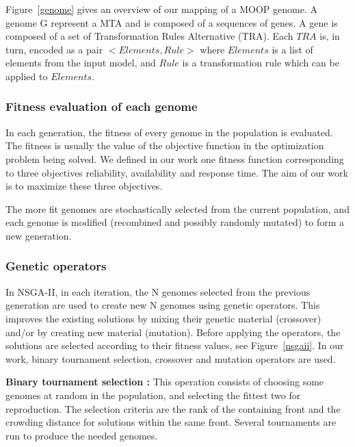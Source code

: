 \documentclass[conference]{IEEEtran}
\begin{document}
Figure~\ref{genome} gives an overview of our mapping of a MOOP genome. A genome G represent a MTA and is composed of a sequences of genes. A gene is composed of a set of Transformation Rules Alternative (TRA). Each $TRA$ is, in turn, encoded as a pair $<Elements,Rule>$ where $Elements$ is a list of elements from the input model, and $Rule$ is a transformation rule which can be applied to $Elements$.


\subsubsection{\textbf{Fitness evaluation of each genome}}
In each generation, the fitness of every genome in the population is evaluated. The fitness is usually the value of the objective function in the optimization problem being solved. We defined in our work one fitness function corresponding to three objectives reliability, availability and response time.
The aim of our work is to maximize these three objectives. 

The more fit genomes are stochastically selected from the current population, and each genome is modified (recombined and possibly randomly mutated) to form a new generation.

\subsubsection{\textbf{Genetic operators}}
In NSGA-II, in each iteration, the N genomes selected from the previous generation are used to create new N genomes using genetic operators. This improves the existing solutions by mixing their genetic material (crossover) and/or by creating new material (mutation). Before applying the operators, the solutions are selected according to their fitness values, see Figure~\ref{nsgaii}. In our work, binary tournament selection, crossover and mutation operators are used.

\textbf{Binary tournament selection :} 
This operation consists of choosing some genomes at random in the population, and selecting the fittest two for reproduction. The selection criteria are the rank of the containing front and the crowding distance for solutions within the same front. Several tournaments are run to produce the needed genomes.
\end{document}
